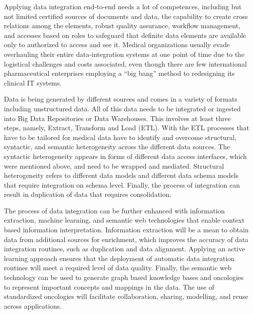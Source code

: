\documentclass[sigconf]{acmart}
\begin{document}
Applying data integration end-to-end needs a lot of competences,
including but not limited certified sources of documents
and data, the capability to create cross relations among the elements, 
robust quality assurance, workflow management, and accesses based 
on roles to safeguard that definite data elements are available only 
to authorized to access and see it. Medical organizations usually evade
overhauling their entire data-integration systems at one point of time
due to the logistical challenges and costs associated, even though
there are few  international pharmaceutical enterprises employing 
a ``big bang'' method to redesigning its clinical IT systems\cite{TR02}.


Data is being generated by different sources and comes in a variety
of formats including unstructured data. All of this data needs to 
be integrated or ingested into Big Data Repositories or Data 
Warehouses. This involves at least three steps, namely, Extract, 
Transform and Load (ETL). With the ETL processes that have to be 
tailored for medical data have to identify and overcome structural,
syntactic, and semantic heterogeneity across the different data 
sources. The syntactic heterogeneity appears in forms of different 
data access interfaces, which were mentioned above, and need to be
wrapped and mediated. Structural heterogeneity refers to different
data models and different data schema models that require 
integration on schema level. Finally, the process of integration 
can result in duplication of data that requires consolidation\cite{TR04}.

The process of data integration can be further enhanced with 
information extraction, machine learning, and semantic web 
technologies that enable context based information interpretation.
Information extraction will be a mean to obtain data from additional
sources for enrichment, which improves the accuracy of data 
integration routines, such as duplication and data alignment. 
Applying an active learning approach ensures that the deployment of
automatic data integration routines will meet a required level of 
data quality. Finally, the semantic web technology can be used to 
generate graph based knowledge bases and oncologies to represent 
important concepts and mappings in the data. The use of standardized 
oncologies will facilitate collaboration, sharing, modelling, and 
reuse across applications\cite{TR04}.
\end{document}

